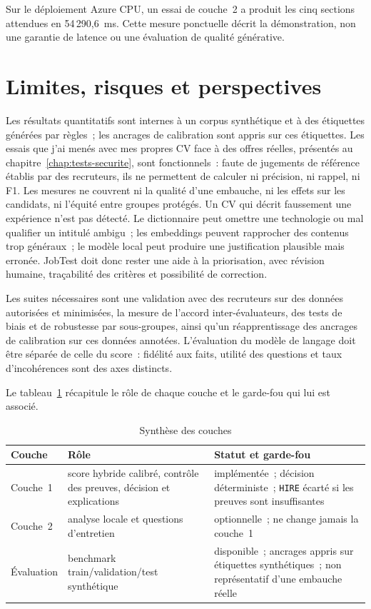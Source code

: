Sur le déploiement Azure CPU, un essai de couche~2 a produit les cinq sections attendues en 54\,290,6~ms. Cette mesure ponctuelle décrit la démonstration, non une garantie de latence ou une évaluation de qualité générative.

\section{Limites, risques et perspectives}

Les résultats quantitatifs sont internes à un corpus synthétique et à des étiquettes générées par règles~; les ancrages de calibration sont appris sur ces étiquettes. Les essais que j'ai menés avec mes propres CV face à des offres réelles, présentés au chapitre~\ref{chap:tests-securite}, sont fonctionnels~: faute de jugements de référence établis par des recruteurs, ils ne permettent de calculer ni précision, ni rappel, ni F1. Les mesures ne couvrent ni la qualité d'une embauche, ni les effets sur les candidats, ni l'équité entre groupes protégés. Un CV qui décrit faussement une expérience n'est pas détecté. Le dictionnaire peut omettre une technologie ou mal qualifier un intitulé ambigu~; les embeddings peuvent rapprocher des contenus trop généraux~; le modèle local peut produire une justification plausible mais erronée. JobTest doit donc rester une aide à la priorisation, avec révision humaine, traçabilité des critères et possibilité de correction.

Les suites nécessaires sont une validation avec des recruteurs sur des données autorisées et minimisées, la mesure de l'accord inter-évaluateurs, des tests de biais et de robustesse par sous-groupes, ainsi qu'un réapprentissage des ancrages de calibration sur ces données annotées. L'évaluation du modèle de langage doit être séparée de celle du score~: fidélité aux faits, utilité des questions et taux d'incohérences sont des axes distincts.

Le tableau~\ref{tab:chap4-synthese} récapitule le rôle de chaque couche et le garde-fou qui lui est associé.

\begin{table}[H]
  \centering
  \caption{Synthèse des couches}
  \label{tab:chap4-synthese}
  \begin{tabular}{|p{3cm}|p{4cm}|p{5cm}|}
    \hline
    Couche & Rôle & Statut et garde-fou \\
    \hline
    Couche~1 & score hybride calibré, contrôle des preuves, décision et explications & implémentée~; décision déterministe~; \texttt{HIRE} écarté si les preuves sont insuffisantes \\
\hline
    Couche~2 & analyse locale et questions d'entretien & optionnelle~; ne change jamais la couche~1 \\
\hline
    Évaluation & benchmark train/validation/test synthétique & disponible~; ancrages appris sur étiquettes synthétiques~; non représentatif d'une embauche réelle \\
    \hline
  \end{tabular}
\end{table}

